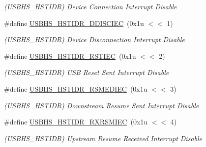 \begin{DoxyCompactItemize}
\begin{DoxyCompactList}\small\item\em (U\+S\+B\+H\+S\+\_\+\+H\+S\+T\+I\+DR) Device Connection Interrupt Disable \end{DoxyCompactList}\item 
\mbox{\label{group__SAMV71__USBHS_gae7c9ec90aa2f4d31dcf59aa75706904b}} 
\#define \mbox{\hyperlink{group__SAMV71__USBHS_gae7c9ec90aa2f4d31dcf59aa75706904b}{U\+S\+B\+H\+S\+\_\+\+H\+S\+T\+I\+D\+R\+\_\+\+D\+D\+I\+S\+C\+I\+EC}}~(0x1u $<$$<$ 1)
\begin{DoxyCompactList}\small\item\em (U\+S\+B\+H\+S\+\_\+\+H\+S\+T\+I\+DR) Device Disconnection Interrupt Disable \end{DoxyCompactList}\item 
\mbox{\label{group__SAMV71__USBHS_ga08e59c5e9f7b06336c5891b816818d20}} 
\#define \mbox{\hyperlink{group__SAMV71__USBHS_ga08e59c5e9f7b06336c5891b816818d20}{U\+S\+B\+H\+S\+\_\+\+H\+S\+T\+I\+D\+R\+\_\+\+R\+S\+T\+I\+EC}}~(0x1u $<$$<$ 2)
\begin{DoxyCompactList}\small\item\em (U\+S\+B\+H\+S\+\_\+\+H\+S\+T\+I\+DR) U\+SB Reset Sent Interrupt Disable \end{DoxyCompactList}\item 
\mbox{\label{group__SAMV71__USBHS_ga7c699747f489cbb80ea42c95a9d6a8d0}} 
\#define \mbox{\hyperlink{group__SAMV71__USBHS_ga7c699747f489cbb80ea42c95a9d6a8d0}{U\+S\+B\+H\+S\+\_\+\+H\+S\+T\+I\+D\+R\+\_\+\+R\+S\+M\+E\+D\+I\+EC}}~(0x1u $<$$<$ 3)
\begin{DoxyCompactList}\small\item\em (U\+S\+B\+H\+S\+\_\+\+H\+S\+T\+I\+DR) Downstream Resume Sent Interrupt Disable \end{DoxyCompactList}\item 
\mbox{\label{group__SAMV71__USBHS_gae0e07a0dbd66d3c04b103b99476029d1}} 
\#define \mbox{\hyperlink{group__SAMV71__USBHS_gae0e07a0dbd66d3c04b103b99476029d1}{U\+S\+B\+H\+S\+\_\+\+H\+S\+T\+I\+D\+R\+\_\+\+R\+X\+R\+S\+M\+I\+EC}}~(0x1u $<$$<$ 4)
\begin{DoxyCompactList}\small\item\em (U\+S\+B\+H\+S\+\_\+\+H\+S\+T\+I\+DR) Upstream Resume Received Interrupt Disable \end{DoxyCompactList}\item 

\end{DoxyCompactItemize}
